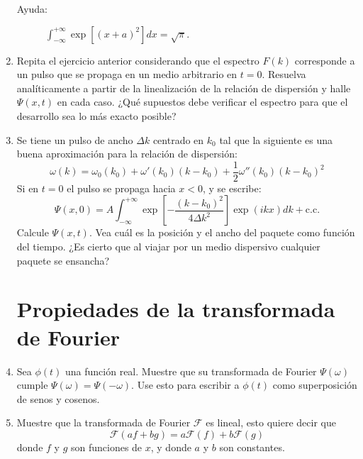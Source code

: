 \documentclass[11pt,spanish]{article}
\begin{document}
\begin{enumerate}
    \begin{description}
        \item [{Ayuda:}] $\int_{-\infty}^{+\infty}\exp\left[(x+a)^{2}\right]dx=\sqrt{\pi}$.
    \end{description}


    \item Repita el ejercicio anterior considerando que el espectro $F(k)$
    corresponde a un pulso que se propaga en un medio arbitrario en $t=0$.
    Resuelva analíticamente a partir de la linealización de la relación de
    dispersión y halle $\Psi(x,t)$ en cada caso. ¿Qué supuestos debe verificar
    el espectro para que el desarrollo sea lo más exacto posible?


    \item Se tiene un pulso de ancho $\Delta k$ centrado en $k_{0}$ tal que
    la siguiente es una buena aproximación para la relación de dispersión:
    \[
    \omega(k)=\omega_{0}(k_{0})+\omega'(k_{0})(k-k_{0})+\frac{1}{2}\omega''(k_{0})(k-k_{0})^{2}
    \]
    Si en $t=0$ el pulso se propaga hacia $x<0$, y se escribe:
    \[
    \Psi(x,0)=A\int_{-\infty}^{+\infty}\exp\left[-\frac{(k-k_{0})^{2}}{4\Delta k^{2}}\right]\exp\left(ikx\right)dk+ \text{c.c.}
    \]
    Calcule $\Psi(x,t)$. Vea cuál es la posición y el ancho del paquete
    como función del tiempo. ¿Es cierto que al viajar por un medio dispersivo
    cualquier paquete se ensancha?


\section*{Propiedades de la transformada de Fourier}    
    
    
    \item Sea $\phi(t)$ una función real. Muestre que su transformada de Fourier
    $\Psi(\omega)$ cumple $\Psi(\omega)=\Psi(-\omega)$. Use esto para escribir a
    $\phi(t)$ como superposición de senos y cosenos.


    \item Muestre que la transformada de Fourier $\mathcal{F}$ es lineal, esto
    quiere decir que
    \[
    \mathcal{F}(af+bg)=a\mathcal{F}(f)+b\mathcal{F}(g)
    \]
    donde $f$ y $g$ son funciones de $x$, y donde $a$ y $b$ son constantes.



\end{enumerate}
\end{document}
